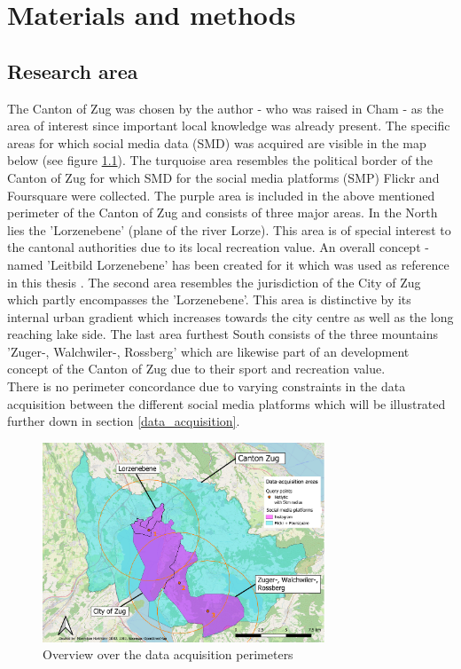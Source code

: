 \chapter{Materials and methods} \label{material_methods}

\section{Research area} \label{research_area}
The Canton of Zug was chosen by the author - who was raised in Cham - as the area of interest since important local knowledge was already present. The specific areas for which social media data (SMD) was acquired are visible in the map below (see figure \ref{fig:research_area}). The turquoise area resembles the political border of the Canton of Zug for which SMD for the social media platforms (SMP) Flickr and Foursquare were collected. The purple area is included in the above mentioned perimeter of the Canton of Zug and consists of three major areas. In the North lies the 'Lorzenebene' (plane of the river Lorze). This area is of special interest to the cantonal authorities due to its local recreation value. An overall concept - named 'Leitbild Lorzenebene' has been created for it which was used as reference in this thesis \parencite{BaudirektiondesKantonsZug2012}. The second area resembles the jurisdiction of the City of Zug which partly encompasses the 'Lorzenebene'. This area is distinctive by its internal urban gradient which increases towards the city centre as well as the long reaching lake side. The last area furthest South consists of the three mountains 'Zuger-, Walchwiler-, Rossberg' which are likewise part of an development concept \parencite{Berchtold2011} of the Canton of Zug due to their sport and recreation value. \\
There is no perimeter concordance due to varying constraints in the data acquisition between the different social media platforms which will be illustrated further down in section \ref{data_acquisition}.

\begin{figure}[h]
   \centering
   \includegraphics[width=0.75\textwidth]{img/overview_research_area_w_Lorzenebene}
   \caption{Overview over the data acquisition perimeters}
   \label{fig:research_area}
\end{figure}


